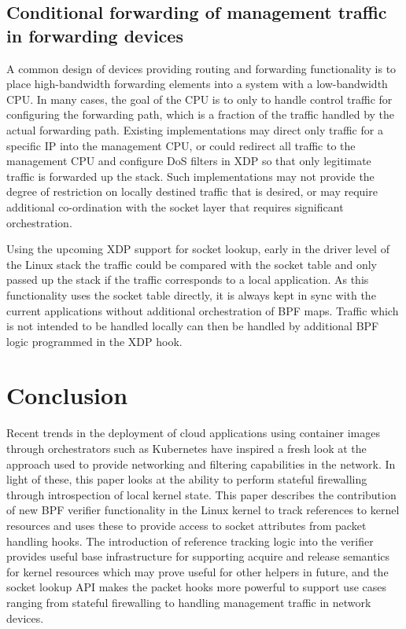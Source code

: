 \documentclass[10pt,sigconf,authorversion]{lpc}
\begin{document}
\subsection{Conditional forwarding of management traffic in forwarding devices}

A common design of devices providing routing and forwarding functionality is to
place high-bandwidth forwarding elements into a system with a low-bandwidth
CPU. In many cases, the goal of the CPU is to only to handle control traffic
for configuring the forwarding path, which is a fraction of the traffic handled
by the actual forwarding path. Existing implementations may direct only traffic
for a specific IP into the management CPU, or could redirect all traffic to the
management CPU and configure DoS filters in XDP so that only legitimate traffic
is forwarded up the stack. Such implementations may not provide the degree of
restriction on locally destined traffic that is desired, or may require
additional co-ordination with the socket layer that requires significant
orchestration.

Using the upcoming XDP support for socket lookup, early in the driver level of
the Linux stack the traffic could be compared with the socket table and only
passed up the stack if the traffic corresponds to a local application. As this
functionality uses the socket table directly, it is always kept in sync with
the current applications without additional orchestration of BPF maps. Traffic
which is not intended to be handled locally can then be handled by additional
BPF logic programmed in the XDP hook.

\section{Conclusion}

Recent trends in the deployment of cloud applications using container images
through orchestrators such as Kubernetes have inspired a fresh look at the
approach used to provide networking and filtering capabilities in the network.
In light of these, this paper looks at the ability to perform stateful
firewalling through introspection of local kernel state. This paper describes
the contribution of new BPF verifier functionality in the Linux kernel to track
references to kernel resources and uses these to provide access to socket
attributes from packet handling hooks. The introduction of reference tracking
logic into the verifier provides useful base infrastructure for supporting
acquire and release semantics for kernel resources which may prove useful for
other helpers in future, and the socket lookup API makes the packet hooks more
powerful to support use cases ranging from stateful firewalling to handling
management traffic in network devices.
\end{document}
